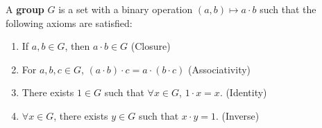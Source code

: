 \phantom{i}

\noindent A \textbf{group} $G$ is a set with a binary operation $(a,b) \mapsto a\cdot b$ such that the following axioms are satisfied:
\begin{enumerate}[start=1, label={(M\arabic*):}]
    \item If $a, b \in G$, then $a\cdot b \in G$ (Closure)
    \item For $a, b, c \in G$, $(a\cdot b)\cdot c = a\cdot(b\cdot c)$ (Associativity)
    \item There exists $1 \in G$ such that $\forall x \in G$, $1 \cdot x = x$. (Identity)
    \item $\forall x \in G$, there exists $y \in G$ such that $x \cdot y = 1$. (Inverse) 
\end{enumerate}

